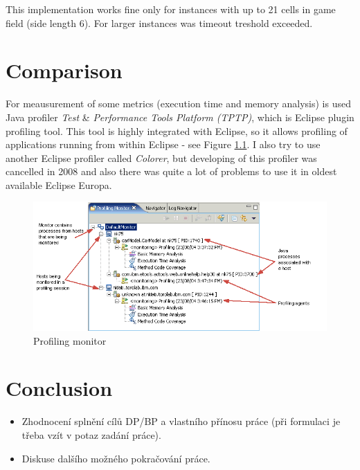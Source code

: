 \documentclass[11pt,twoside,a4paper]{book}
\begin{document}
This implementation works fine only for instances with up to 21 cells in game
field (side length 6). For larger instances was timeout treshold exceeded.
\newpage



\chapter{Comparison}
For meausurement of some metrics (execution time and memory analysis) is
used Java profiler \textit{Test} \& \textit{Performance Tools Platform (TPTP)},
which is Eclipse plugin profiling tool. This tool is highly integrated with Eclipse, so
it allows profiling of applications running from within Eclipse - see Figure
\ref{fig:pfMonitor}. I also try to use another Eclipse profiler called
\textit{Colorer}, but developing of this profiler was cancelled in 2008
and also there was quite a lot of problems to use it in oldest available Eclipse
Europa.


\begin{figure}[ht]
\begin{center}
\includegraphics[width=14cm]{figures/pf}
\caption{Profiling monitor}
\label{fig:pfMonitor}
\end{center}
\end{figure}

\chapter{Conclusion}

\begin{itemize}
\item Zhodnocení splnění cílů DP/BP a  vlastního přínosu práce (při formulaci je třeba vzít v potaz zadání práce).
\item Diskuse dalšího možného pokračování práce.
\end{itemize} 
\end{document}
